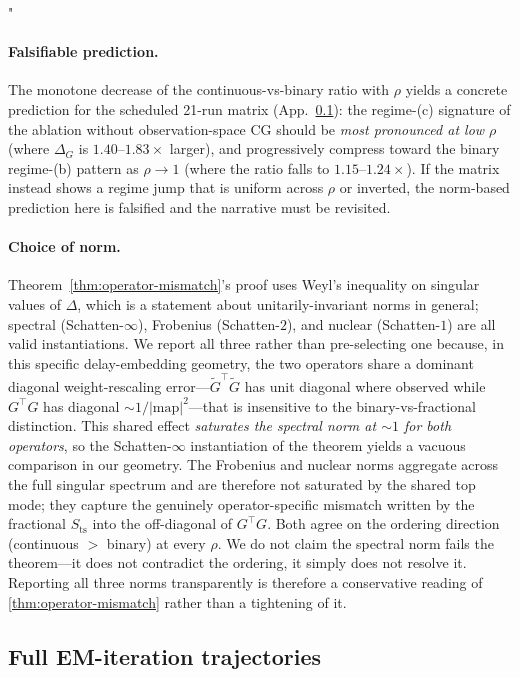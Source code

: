 "\documentclass{article}
\theoremstyle{plain}
\theoremstyle{definition}
\theoremstyle{remark}
\begin{document}
\paragraph{Falsifiable prediction.}
The monotone decrease of the continuous-vs-binary ratio with $\rho$ yields a concrete prediction for the scheduled 21-run matrix (App.~\ref{app:continuous-trajectories}): the regime-(c) signature of the ablation without observation-space CG should be \emph{most pronounced at low $\rho$} (where $\Delta_G$ is $1.40$--$1.83\times$ larger), and progressively compress toward the binary regime-(b) pattern as $\rho \to 1$ (where the ratio falls to $1.15$--$1.24\times$). If the matrix instead shows a regime jump that is uniform across $\rho$ or inverted, the norm-based prediction here is falsified and the narrative must be revisited.

\paragraph{Choice of norm.}
Theorem~\ref{thm:operator-mismatch}'s proof uses Weyl's inequality on singular values of $\Delta$, which is a statement about unitarily-invariant norms in general; spectral (Schatten-$\infty$), Frobenius (Schatten-$2$), and nuclear (Schatten-$1$) are all valid instantiations. We report all three rather than pre-selecting one because, in this specific delay-embedding geometry, the two operators share a dominant diagonal weight-rescaling error---$\tilde{G}^\top\tilde{G}$ has unit diagonal where observed while $G^\top G$ has diagonal $\sim 1/|\mathrm{map}|^2$---that is insensitive to the binary-vs-fractional distinction. This shared effect \emph{saturates the spectral norm at $\sim 1$ for both operators}, so the Schatten-$\infty$ instantiation of the theorem yields a vacuous comparison in our geometry. The Frobenius and nuclear norms aggregate across the full singular spectrum and are therefore not saturated by the shared top mode; they capture the genuinely operator-specific mismatch written by the fractional $S_{\mathrm{ts}}$ into the off-diagonal of $G^\top G$. Both agree on the ordering direction (continuous $>$ binary) at every $\rho$. We do not claim the spectral norm fails the theorem---it does not contradict the ordering, it simply does not resolve it. Reporting all three norms transparently is therefore a conservative reading of \cref{thm:operator-mismatch} rather than a tightening of it.

\subsection{Full EM-iteration trajectories}
\label{app:continuous-trajectories}
\end{document}
